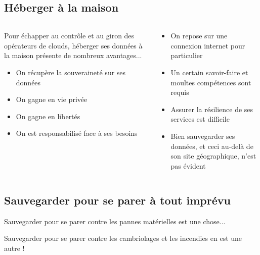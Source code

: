 \documentclass[11pt, aspectratio=1610]{beamer}
\begin{document}
\subsection{Héberger à la maison}
\begin{frame}
\begin{columns}
\begin{column}{0.5 \linewidth}
\begin{center}
Pour échapper au contrôle et au giron des opérateurs de clouds, héberger ses données à la maison présente de nombreux avantages...
\end{center}

\vspace{0.5cm}

\begin{itemize}[<+(1)->]
\item On récupère la souveraineté sur ses données
\item On gagne en vie privée
\item On gagne en libertés
\item On est responsabilisé face à ses besoins
\end{itemize}
\end{column}
\vrule{}
\begin{column}{0.5 \linewidth}
\begin{center}
\end{center}

\vspace{0.5cm}

\begin{itemize}[<+(2)->]
\item On repose sur une connexion internet pour particulier
\item Un certain savoir-faire et moultes compétences sont requis
\item Assurer la résilience de ses services est difficile
\item Bien sauvegarder ses données, et ceci au-delà de son site géographique, n'est pas évident
\end{itemize}
\end{column}
\end{columns}
\end{frame}

\subsection{Sauvegarder pour se parer à tout imprévu}
\begin{frame}
\begin{center}
Sauvegarder pour se parer contre les pannes matérielles est une chose...

Sauvegarder pour se parer contre les cambriolages et les incendies en est une autre !\linebreak

\vspace{1cm}
\end{center}
\end{frame}
\end{document}
